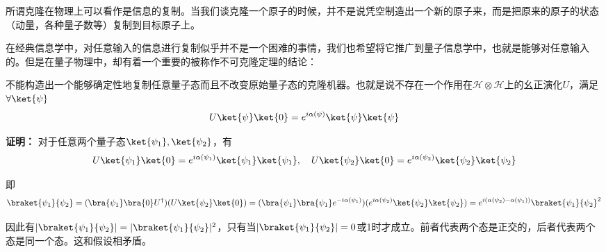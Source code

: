 
所谓克隆在物理上可以看作是信息的复制。当我们谈克隆一个原子的时候，并不是说凭空制造出一个新的原子来，而是把原来的原子的状态（动量，各种量子数等）复制到目标原子上。

在经典信息学中，对任意输入的信息进行复制似乎并不是一个困难的事情，我们也希望将它推广到量子信息学中，也就是能够对任意输入的。但是在量子物理中，却有着一个重要的被称作不可克隆定理的结论：
\begin{theorem}{}
不能构造出一个能够确定性地复制任意量子态而且不改变原始量子态的克隆机器。也就是说不存在一个作用在$\mathcal{H}\otimes\mathcal{H}$上的幺正演化$U$，满足$\forall\ket{\psi}$
\begin{equation}
U\ket{\psi}\ket{0}=e^{i\alpha(\psi)}\ket{\psi}\ket{\psi}
\end{equation}
\end{theorem}

\textbf{证明：}
对于任意两个量子态$\ket{\psi_1},\ket{\psi_2}$，有\begin{equation}
 U\ket{\psi_1}\ket{0}=e^{i\alpha(\psi_1)}\ket{\psi_1}\ket{\psi_1},\quad U\ket{\psi_2}\ket{0}=e^{i\alpha(\psi_2)}\ket{\psi_2}\ket{\psi_2}
\end{equation}

即\begin{equation}
\braket{\psi_1}{\psi_2}=(\bra{\psi_1}\bra{0}U^\dagger)(U\ket{\psi_2}\ket{0})=(\bra{\psi_1}\bra{\psi_1}e^{-i\alpha(\psi_1)})(e^{i\alpha(\psi_2)}\ket{\psi_2}\ket{\psi_2})=e^{i(\alpha(\psi_2)-\alpha(\psi_1))}\braket{\psi_1}{\psi_2}^2
\end{equation}

因此有$|\braket{\psi_1}{\psi_2}|=|\braket{\psi_1}{\psi_2}|^2$，只有当$|\braket{\psi_1}{\psi_2}|=0$或1时才成立。前者代表两个态是正交的，后者代表两个态是同一个态。这和假设相矛盾。

